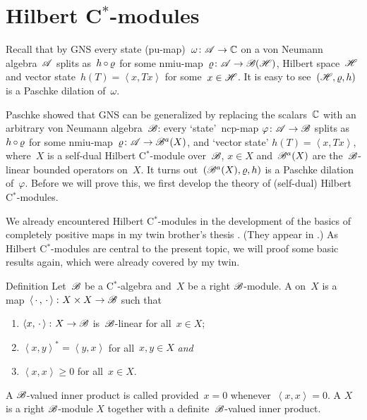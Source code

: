 \documentclass[b]{subfiles}
\begin{document}
\section{Hilbert C$^*$-modules}
\begin{parsec}%
\begin{point}%
Recall that by GNS
    every state (pu-map)~$\omega\colon \mathscr{A} \to \mathbb{C}$
    on a von Neumann algebra~$\mathscr{A}$
    splits as~$h \mathop{\circ} \varrho$
    for some nmiu-map~$\varrho\colon \mathscr{A} \to \mathscr{B}(\mathscr{H})$,
        Hilbert space~$\mathscr{H}$
        and vector state~$h (T) =  \left<x, T x\right>$
         for some~$x \in \mathscr{H}$.
It is easy to see~$(\mathscr{H}, \varrho, h)$ is a Paschke dilation of~$\omega$.


Paschke showed that GNS can be generalized by replacing the scalars~$\mathbb{C}$
    with an arbitrary von Neumann algebra~$\mathscr{B}$:
    every `state'~ncp-map $\varphi\colon \mathscr{A} \to \mathscr{B}$
    splits as~$h \mathop{\circ} \varrho$
    for some nmiu-map~$\varrho\colon \mathscr{A} \to \mathscr{B}^a (X)$,
    and `vector state' $h(T) = \left<x, Tx\right>$,
    where~$X$ is a self-dual Hilbert C$^*$-module over~$\mathscr{B}$, $x \in X$
     and~$\mathscr{B}^a(X)$ are the~$\mathscr{B}$-linear bounded operators on~$X$.
It turns out~$(\mathscr{B}^a(X), \varrho, h)$
    is a Paschke dilation of~$\varphi$.
Before we will prove this,
    we first develop the theory of (self-dual) Hilbert C$^*$-modules.

We already encountered Hilbert C$^*$-modules
    in the development of the basics of completely positive maps
    in my twin brother's thesis \cite{bram}.
(They appear in .)
As Hilbert C$^*$-modules are central to the present topic,
    we will proof some basic results again, which were already
    covered by my twin.
\end{point}
\begin{point}{Definition}%
    Let~$\mathscr{B}$ be a C$^*$-algebra and~$X$
        be a right $\mathscr{B}$-module.
        A  on~$X$
        is a map~$\left<\,\cdot\,,\,\cdot\,\right>\colon X \times X \to \mathscr{B}$
        such that
        \begin{enumerate}
            \item $\left<x, \,\cdot\,\right> \colon X \to  \mathscr{B}$
                    is~$\mathscr{B}$-linear for all~$x \in X$;
            \item $\left<x,y\right>^* = \left<y,x\right>$
                for all~$x,y\in X$ \emph{and}
            \item $\left<x,x\right> \geq 0$ for all~$x \in X$.
        \end{enumerate}
        A $\mathscr{B}$-valued inner product is called 
        provided~$x = 0$ whenever~$\left<x,x\right>=0$.
        A  $X$
        is a right $\mathscr{B}$-module $X$
        together with a definite~$\mathscr{B}$-valued inner product.


\end{point}
\end{parsec}
\end{document}
